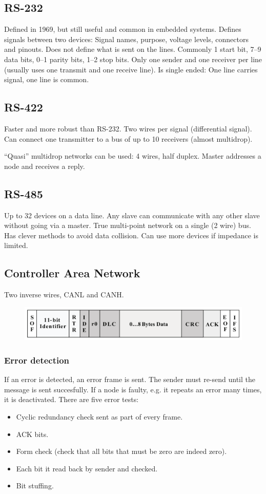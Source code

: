 \documentclass[a4paper, 12pt]{article}
\begin{document}
\subsection{RS-232}
Defined in 1969, but still useful and common in embedded systems. Defines signals between two devices: Signal names, purpose, voltage levels, connectors and pinouts. Does not define what is sent on the lines. Commonly 1 start bit, 7--9 data bits, 0--1 parity bits, 1--2 stop bits. Only one sender and one receiver per line (usually uses one transmit and one receive line). Is single ended: One line carries signal, one line is common.

\subsection{RS-422}
Faster and more robust than RS-232. Two wires per signal (differential signal). Can connect one transmitter to a bus of up to 10 receivers (almost multidrop).

``Quasi'' multidrop networks can be used: 4 wires, half duplex. Master addresses a node and receives a reply.

\subsection{RS-485}
Up to 32 devices on a data line. Any slave can communicate with any other slave without going via a master. True multi-point network on a single (2 wire) bus. Has clever methods to avoid data collision. Can use more devices if impedance is limited.

\subsection{Controller Area Network}
Two inverse wires, CANL and CANH.
\begin{figure}[H]
\centering
\includegraphics[width=0.8\linewidth]{can_frame}
\end{figure}

\subsubsection{Error detection}
If an error is detected, an error frame is sent. The sender must re-send until the message is sent succesfully. If a node is faulty, e.g. it repeats an error many times, it is deactivated. There are five error tests:
\begin{itemize}[noitemsep]
\item Cyclic redundancy check sent as part of every frame.
\item ACK bits.
\item Form check (check that all bits that must be zero are indeed zero).
\item Each bit it read back by sender and checked.
\item Bit stuffing.
\end{itemize}
\end{document}
